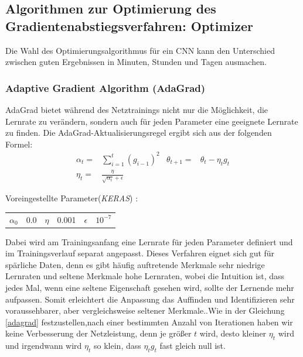 \documentclass[12pt,a4paper]{scrartcl}
\numberwithin{equation}{section}
\begin{document}
\subsection{Algorithmen zur Optimierung des Gradientenabstiegsverfahren:	Optimizer}
Die Wahl des Optimierungsalgorithmus für ein \ac{CNN} kann den Unterschied zwischen guten Ergebnissen in Minuten, Stunden und Tagen ausmachen.
\subsubsection{Adaptive Gradient Algorithm (AdaGrad)}
AdaGrad bietet während des Netztrainings nicht nur die Möglichkeit, die Lernrate zu verändern, sondern auch für jeden Parameter eine geeignete Lernrate zu finden. Die AdaGrad-Aktualisierungsregel ergibt sich aus der folgenden Formel:
\begin{equation}\label{adagrad}
\begin{aligned}
\alpha_{t}=&\sum_{i = 1}^{t}{(g_{i-1})^2} &
\theta_{t+1} =& \theta_{t} -\eta_{t} g_t \\ \eta_{t} =& \frac{\eta}{\sqrt{\alpha_{t}}+\epsilon}
\end{aligned}
\end{equation}
\begin{center}
	Voreingestellte Parameter(\textit{KERAS}) :
	\begin{tabular}{r@{= }l c@{= }c r@{= }l}
		$ \alpha_{0} $& 0.0 & $ \eta$& 0.001& $ \epsilon $ & $ 10^{-7} $
	\end{tabular}
\end{center}
Dabei wird am Trainingsanfang eine Lernrate für jeden Parameter definiert und im Trainingsverlauf separat angepasst. 
Dieses Verfahren eignet sich gut für spärliche Daten, denn es gibt häufig auftretende Merkmale sehr niedrige Lernraten und seltene Merkmale hohe Lernraten, wobei die Intuition ist, dass jedes Mal, wenn eine seltene Eigenschaft gesehen wird, sollte der Lernende mehr aufpassen. Somit erleichtert die Anpassung das Auffinden und Identifizieren sehr voraussehbarer, aber vergleichsweise seltener Merkmale.\cite{AdaGrad}.Wie in der Gleichung \eqref{adagrad} festzustellen,nach einer bestimmten Anzahl von Iterationen haben wir keine Verbesserung der Netzleistung, denn je größer $ t $ wird, desto kleiner $ \eta_{t} $ wird und irgendwann wird $ \eta_{t} $ so klein, dass $ \eta_{t}g_{t} $ fast gleich null ist.
\end{document}
